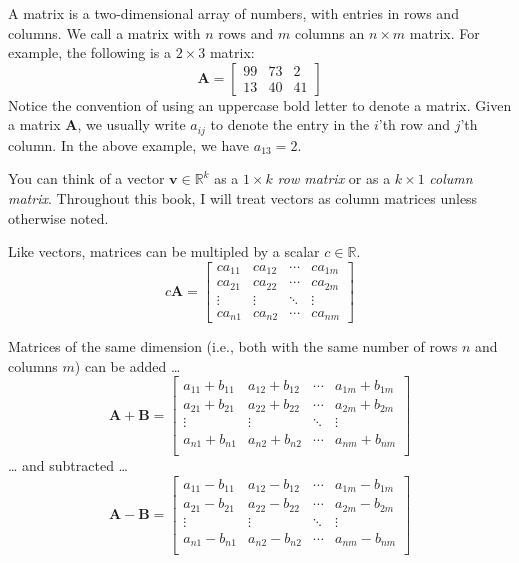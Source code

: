 \documentclass[
  12pt,
  oneside,openany]{book}
\begin{document}
A matrix is a two-dimensional array of numbers, with entries in rows and columns. We call a matrix with \(n\) rows and \(m\) columns an \(n \times m\) matrix. For example, the following is a \(2 \times 3\) matrix:
\[
\mathbf{A}
=
\begin{bmatrix}
  99 & 73 & 2 \\
  13 & 40 & 41
\end{bmatrix}
\]
Notice the convention of using an uppercase bold letter to denote a matrix. Given a matrix \(\mathbf{A}\), we usually write \(a_{ij}\) to denote the entry in the \(i\)'th row and \(j\)'th column. In the above example, we have \(a_{13} = 2\).

You can think of a vector \(\mathbf{v} \in \mathbb{R}^k\) as a \(1 \times k\) \emph{row matrix} or as a \(k \times 1\) \emph{column matrix}. Throughout this book, I will treat vectors as column matrices unless otherwise noted.

Like vectors, matrices can be multipled by a scalar \(c \in \mathbb{R}\).
\[
c \mathbf{A} =
\begin{bmatrix}
  c a_{11} & c a_{12} & \cdots & c a_{1m} \\
  c a_{21} & c a_{22} & \cdots & c a_{2m} \\
  \vdots & \vdots & \ddots & \vdots \\
  c a_{n1} & c a_{n2} & \cdots & c a_{nm}
\end{bmatrix}
\]

Matrices of the same dimension (i.e., both with the same number of rows \(n\) and columns \(m\)) can be added \ldots{}
\[
\mathbf{A} + \mathbf{B} =
\begin{bmatrix}
  a_{11} + b_{11} & a_{12} + b_{12} & \cdots & a_{1m} + b_{1m} \\
  a_{21} + b_{21} & a_{22} + b_{22} & \cdots & a_{2m} + b_{2m} \\
  \vdots & \vdots & \ddots & \vdots \\
  a_{n1} + b_{n1} & a_{n2} + b_{n2} & \cdots & a_{nm} + b_{nm} \\
\end{bmatrix}
\]
\ldots{} and subtracted \ldots{}
\[
\mathbf{A} - \mathbf{B} =
\begin{bmatrix}
  a_{11} - b_{11} & a_{12} - b_{12} & \cdots & a_{1m} - b_{1m} \\
  a_{21} - b_{21} & a_{22} - b_{22} & \cdots & a_{2m} - b_{2m} \\
  \vdots & \vdots & \ddots & \vdots \\
  a_{n1} - b_{n1} & a_{n2} - b_{n2} & \cdots & a_{nm} - b_{nm} \\
\end{bmatrix}
\]
\end{document}
